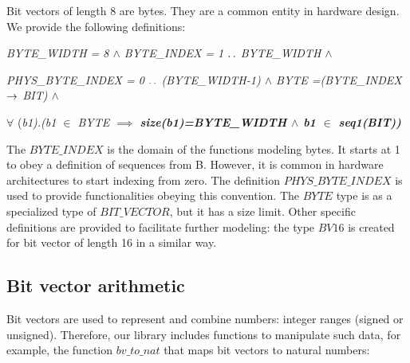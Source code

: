 \documentclass[a4paper]{llncs}
\begin{document}
Bit vectors of length 8 are bytes. They are a common entity in
hardware design. We provide the following definitions:


\hspace*{0.0in}\it BYTE\_WIDTH \rm = 8 $\land$ \it BYTE\_INDEX \rm = 1 $\mathbin{\ldotp\ldotp}$ \rm  BYTE\_WIDTH\rm  \hspace*{0.03in} $\land$

\hspace*{0.0in}\it PHYS\_BYTE\_INDEX \rm = \rm 0 $\mathbin{\ldotp\ldotp}$ \rm (\it BYTE\_WIDTH\rm -\rm 1\rm )\hspace*{0.03in} $\land$ \hspace*{0.0in}\it BYTE \rm =\rm (\it BYTE\_INDEX  $\rightarrow$  \it BIT\rm )\hspace*{0.0in} $\land$  


\hspace*{0.0in}$\forall$ \rm (\it b1\rm )\rm .\rm (\it b1  $\in$  \it BYTE  $\implies$  \bf size\rm (\it b1\rm )\rm =\it BYTE\_WIDTH  $\land$  \it b1  $\in$  \bf seq1\rm (\it BIT\rm )\rm ) 



The $\textit{BYTE\_INDEX}$ is the domain of the functions modeling bytes. It starts at 1 to obey a
definition of sequences from B. However, it is common in hardware architectures to start indexing from
zero. The definition $\textit{PHYS\_BYTE\_INDEX}$ is used to provide functionalities obeying this
convention. The $\textit{BYTE}$ type is as a specialized type of $\textit{BIT\_VECTOR}$, but it has a size
limit. Other specific definitions are provided to facilitate further modeling: the type $\textit{BV16}$
is created for bit vector of length 16 in a similar way.



\subsection{Bit vector arithmetic}
\label{subsec:Types}
 

Bit vectors are used to represent and combine numbers: integer ranges (signed or unsigned). Therefore, our
library includes functions to manipulate such data, for example, the function $\textit{bv\_to\_nat}$ that
maps bit vectors to natural numbers:
\end{document}
